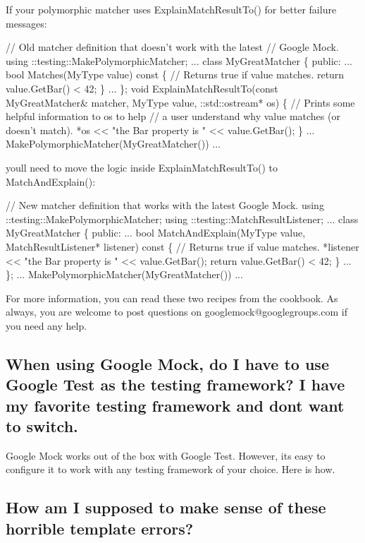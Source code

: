 If your polymorphic matcher uses {\ttfamily Explain\+Match\+Result\+To()} for better failure messages\+: 
\begin{DoxyCode}
// Old matcher definition that doesn't work with the latest
// Google Mock.
using ::testing::MakePolymorphicMatcher;
...
class MyGreatMatcher \{
 public:
  ...
  bool Matches(MyType value) const \{
    // Returns true if value matches.
    return value.GetBar() < 42;
  \}
  ...
\};
void ExplainMatchResultTo(const MyGreatMatcher& matcher,
                          MyType value,
                          ::std::ostream* os) \{
  // Prints some helpful information to os to help
  // a user understand why value matches (or doesn't match).
  *os << "the Bar property is " << value.GetBar();
\}
... MakePolymorphicMatcher(MyGreatMatcher()) ...
\end{DoxyCode}


you\textquotesingle{}ll need to move the logic inside {\ttfamily Explain\+Match\+Result\+To()} to {\ttfamily Match\+And\+Explain()}\+: 
\begin{DoxyCode}
// New matcher definition that works with the latest Google Mock.
using ::testing::MakePolymorphicMatcher;
using ::testing::MatchResultListener;
...
class MyGreatMatcher \{
 public:
  ...
  bool MatchAndExplain(MyType value,
                       MatchResultListener* listener) const \{
    // Returns true if value matches.
    *listener << "the Bar property is " << value.GetBar();
    return value.GetBar() < 42;
  \}
  ...
\};
... MakePolymorphicMatcher(MyGreatMatcher()) ...
\end{DoxyCode}


For more information, you can read these two recipes from the cookbook. As always, you are welcome to post questions on {\ttfamily googlemock@googlegroups.\+com} if you need any help.

\subsection*{When using Google Mock, do I have to use Google Test as the testing framework? I have my favorite testing framework and don\textquotesingle{}t want to switch.}

Google Mock works out of the box with Google Test. However, it\textquotesingle{}s easy to configure it to work with any testing framework of your choice. Here is how.

\subsection*{How am I supposed to make sense of these horrible template errors?}

